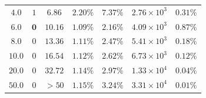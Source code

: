 \documentclass[preprint,12pt]{elsarticle}
\begin{document}
\begin{table}[!htbp]
{\begin{tabular}{@{} c c c c c c c @{}}
            $4.0$              & $1$                         & $6.86$                                          & $2.20\%$                                        & $7.37\%$                                     & $2.76 \times 10^3$               & $0.31\%$               \\
            $6.0$              & $\mathbf{0}$                & $\mathbf{10.16}$                                & $\mathbf{1.09\%}$                               & $\mathbf{2.16\%}$                            & $4.09 \times 10^3$               & $0.87\%$               \\
            $8.0$              & $0$                         & $13.36$                                         & $1.11\%$                                        & $2.47\%$                                     & $5.41 \times 10^3$               & $0.18\%$               \\
            $10.0$             & $0$                         & $16.54$                                         & $1.12\%$                                        & $2.62\%$                                     & $6.73 \times 10^3$               & $0.12\%$               \\
            $20.0$             & $0$                         & $32.72$                                         & $1.14\%$                                        & $2.97\%$                                     & $1.33 \times 10^4$               & $0.04\%$               \\
            $50.0$             & $0$                         & $> 50$                                          & $1.15\%$                                        & $3.24\%$                                     & $3.31 \times 10^4$               & $0.01\%$               \\
            \bottomrule
        \end{tabular}%
    }
\end{table}
\end{document}

